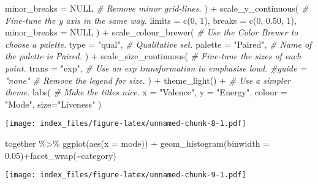 \documentclass[
]{article}
\newenvironment{Shaded}{\begin{snugshade}}{\end{snugshade}}
\newcommand{\AttributeTok}[1]{\textcolor[rgb]{0.77,0.63,0.00}{#1}}
\newcommand{\CommentTok}[1]{\textcolor[rgb]{0.56,0.35,0.01}{\textit{#1}}}
\newcommand{\ConstantTok}[1]{\textcolor[rgb]{0.00,0.00,0.00}{#1}}
\newcommand{\DecValTok}[1]{\textcolor[rgb]{0.00,0.00,0.81}{#1}}
\newcommand{\FloatTok}[1]{\textcolor[rgb]{0.00,0.00,0.81}{#1}}
\newcommand{\FunctionTok}[1]{\textcolor[rgb]{0.00,0.00,0.00}{#1}}
\newcommand{\NormalTok}[1]{#1}
\newcommand{\SpecialCharTok}[1]{\textcolor[rgb]{0.00,0.00,0.00}{#1}}
\newcommand{\StringTok}[1]{\textcolor[rgb]{0.31,0.60,0.02}{#1}}
\begin{document}
\begin{Shaded}
\begin{Highlighting}[]
    \AttributeTok{minor\_breaks =} \ConstantTok{NULL}       \CommentTok{\# Remove \textquotesingle{}minor\textquotesingle{} grid{-}lines.}
\NormalTok{  ) }\SpecialCharTok{+}
  \FunctionTok{scale\_y\_continuous}\NormalTok{(         }\CommentTok{\# Fine{-}tune the y axis in the same way.}
    \AttributeTok{limits =} \FunctionTok{c}\NormalTok{(}\DecValTok{0}\NormalTok{, }\DecValTok{1}\NormalTok{),}
    \AttributeTok{breaks =} \FunctionTok{c}\NormalTok{(}\DecValTok{0}\NormalTok{, }\FloatTok{0.50}\NormalTok{, }\DecValTok{1}\NormalTok{),}
    \AttributeTok{minor\_breaks =} \ConstantTok{NULL}
\NormalTok{  ) }\SpecialCharTok{+}
  \FunctionTok{scale\_colour\_brewer}\NormalTok{(        }\CommentTok{\# Use the Color Brewer to choose a palette.}
    \AttributeTok{type =} \StringTok{"qual"}\NormalTok{,            }\CommentTok{\# Qualitative set.}
    \AttributeTok{palette =} \StringTok{"Paired"}\NormalTok{,  }\CommentTok{\# Name of the palette is \textquotesingle{}Paired\textquotesingle{}.}
\NormalTok{    ) }\SpecialCharTok{+}
  \FunctionTok{scale\_size\_continuous}\NormalTok{(      }\CommentTok{\# Fine{-}tune the sizes of each point.}
     \AttributeTok{trans =} \StringTok{"exp"}\NormalTok{,            }\CommentTok{\# Use an exp transformation to emphasise loud.}
     \CommentTok{\#guide = "none"            \# Remove the legend for size.}
\NormalTok{  ) }\SpecialCharTok{+}
  \FunctionTok{theme\_light}\NormalTok{() }\SpecialCharTok{+}             \CommentTok{\# Use a simpler theme.}
  \FunctionTok{labs}\NormalTok{(                       }\CommentTok{\# Make the titles nice.}
    \AttributeTok{x =} \StringTok{"Valence"}\NormalTok{,}
    \AttributeTok{y =} \StringTok{"Energy"}\NormalTok{,}
    \AttributeTok{colour =} \StringTok{"Mode"}\NormalTok{,}
    \AttributeTok{size=}\StringTok{"Liveness"}
\NormalTok{  )}
\end{Highlighting}
\end{Shaded}

\texttt{[image: index\_files/figure-latex/unnamed-chunk-8-1.pdf]}

\begin{Shaded}
\begin{Highlighting}[]
\NormalTok{together }\SpecialCharTok{\%\textgreater{}\%} \FunctionTok{ggplot}\NormalTok{(}\FunctionTok{aes}\NormalTok{(}\AttributeTok{x =}\NormalTok{ mode)) }\SpecialCharTok{+} \FunctionTok{geom\_histogram}\NormalTok{(}\AttributeTok{binwidth =} \FloatTok{0.05}\NormalTok{)}\SpecialCharTok{+}\FunctionTok{facet\_wrap}\NormalTok{(}\SpecialCharTok{\textasciitilde{}}\NormalTok{category)}
\end{Highlighting}
\end{Shaded}

\texttt{[image: index\_files/figure-latex/unnamed-chunk-9-1.pdf]}
\end{document}
